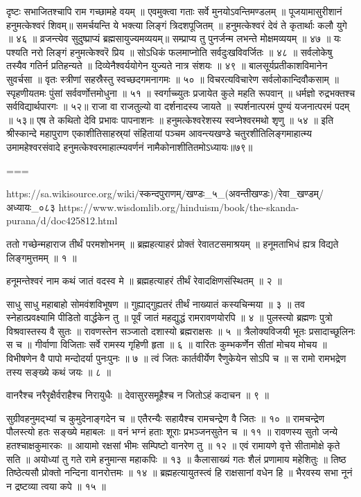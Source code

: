 दृष्टः सभाजितश्चापि राम गच्छामहे वयम् ॥
एवमुक्त्वा गताः सर्वे मुनयोऽवन्तिमण्डलम् ॥
पूजयामासुरीशानं हनुमत्केश्वरं शिवम्॥
समर्चयन्ति ये भक्त्या लिङ्गं त्रिदशपूजितम् ॥
हनुमत्केश्वरं देवं ते कृतार्थाः कलौ युगे ॥ ४६ ॥
व्रजन्त्येव सुदुष्प्राप्यं ब्रह्मसायुज्यमव्ययम्॥
सम्प्राप्य तु पुनर्जन्म लभन्ते मोक्षमव्ययम् ॥ ४७ ॥
यः पश्यति नरो लिङ्गं हनुमत्केश्वरॆ प्रिय ॥
सोऽधिकं फलमाप्नोति सर्वदुःखविवर्जितः ॥ ४८ ॥
सर्वलोकेषु तस्यैव गतिर्न प्रतिहन्यते ॥
दिव्येनैश्वर्ययोगेन युज्यते नात्र संशयः ॥ ४९ ॥
बालसूर्यप्रतीकाशविमानेन सुवर्चसा ॥
वृतः स्त्रीणां सहस्रैस्तु स्वच्छदगमनागमः ॥ ५० ॥
विचरत्यविचारेण सर्वलोकान्दिवौकसाम् ॥
स्पृहणीयतमः पुंसां सर्ववर्णोत्तमोधुना ॥ ५१ ॥
स्वर्गाच्च्युतः प्रजायेत कुले महति रूपवान् ॥
धर्मज्ञो रुद्रभक्तश्च सर्वविद्यार्थपारगः ॥ ५२॥
राजा वा राजतुल्यो वा दर्शनादस्य जायते ॥
स्पर्शनात्परमं पुण्यं यजनात्परमं पदम् ॥ ५३॥
एष ते कथितो देवि प्रभावः पापनाशनः ॥
हनुमत्केश्वरेशस्य स्वप्नेश्वरमथो शृणु ॥ ५४ ॥
इति श्रीस्कान्दे महापुराण एकाशीतिसाहस्र्यां संहितायां पञ्चम आवन्त्यखण्डे चतुरशीतिलिङ्गमाहात्म्य उमामहेश्वरसंवादे हनुमत्केश्वरमाहात्म्यवर्णनं नामैकोनाशीतितमोऽध्यायः॥७९॥

===

https://sa.wikisource.org/wiki/स्कन्दपुराणम्/खण्डः_५_(अवन्तीखण्डः)/रेवा_खण्डम्/अध्यायः_०८३
https://www.wisdomlib.org/hinduism/book/the-skanda-purana/d/doc425812.html


ततो गच्छेन्महाराज तीर्थं परमशोभनम् ॥
ब्रह्महत्याहरं प्रोक्तं रेवातटसमाश्रयम् ॥
हनूमताभिधं ह्यत्र विद्यते लिङ्गमुत्तमम् ॥ १ ॥

हनूमन्तेश्वरं नाम कथं जातं वदस्व मे ॥
ब्रह्महत्याहरं तीर्थं रेवादक्षिणसंस्थितम् ॥ २ ॥

साधु साधु महाबाहो सोमवंशविभूषण ॥
गुह्याद्गुह्यतरं तीर्थं नाख्यातं कस्यचिन्मया ॥ ३ ॥
तव स्नेहात्प्रवक्ष्यामि पीडितो वार्द्धकेन तु ॥
पूर्वं जातं महद्युद्धं रामरावणयोरपि ॥ ४ ॥
पुलस्त्यो ब्रह्मणः पुत्रो विश्रवास्तस्य वै सुतः ॥
रावणस्तेन सञ्जातो दशास्यो ब्रह्मराक्षसः ॥ ५ ॥
त्रैलोक्यविजयी भूतः प्रसादाच्छूलिनः स च ॥
गीर्वाणा विजिताः सर्वे रामस्य गृहिणी हृता ॥ ६ ॥
वारितः कुम्भकर्णेन सीतां मोचय मोचय ॥
विभीषणेन वै पापो मन्दोदर्या पुनःपुनः ॥ ७ ॥
त्वं जितः कार्तवीर्येण रैणुकेयेन सोऽपि च ॥
स रामो रामभद्रेण तस्य सङ्ख्ये कथं जयः ॥ ८ ॥

वानरैश्च नरैरृक्षैर्वराहैश्च निरायुधैः ॥
देवासुरसमूहैश्च न जितोऽहं कदाचन ॥ ९ ॥

सुग्रीवहनुमद्भ्यां च कुमुदेनाङ्गदेन च ॥
एतैरन्यैः सहायैश्च रामचन्द्रेण वै जितः ॥ १० ॥
रामचन्द्रेण पौलस्त्यो हतः सङ्ख्ये महाबलः ॥
वनं भग्नं हताः शूराः प्रभञ्जनसुतेन च ॥ ११ ॥
रावणस्य सुतो जन्ये हतश्चाक्षकुमारकः ॥
आयामो रक्षसां भीमः सम्पिष्टो वानरेण तु ॥ १२ ॥
एवं रामायणे वृत्ते सीतामोक्षे कृते सति ॥
अयोध्यां तु गते रामे हनुमान्स महाकपिः ॥ १३ ॥
कैलासाख्यं गतः शैलं प्रणामाय महेशितुः ॥
तिष्ठ तिष्ठेत्यसौ प्रोक्तो नन्दिना वानरोत्तमः ॥ १४ ॥
ब्रह्महत्यायुतस्त्वं हि राक्षसानां वधेन हि ॥
भैरवस्य सभा नूनं न द्रष्टव्या त्वया कपे ॥ १५ ॥

